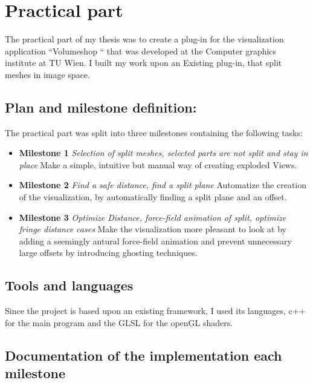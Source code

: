\chapter{Practical part}
The practical part of my thesis was to create a plug-in for the visualization application ``Volumeshop `` that was developed at the Computer graphics institute at TU Wien. I built my work upon an Existing plug-in, that split meshes in image space.
\section{Plan and milestone definition:}
The practical part was split into three milestones containing the following tasks:
\begin{itemize}
\item \textbf{Milestone 1} \emph{Selection of split meshes, selected parts are not split and stay in place} Make a simple, intuitive but manual way of creating exploded Views.
\item \textbf{Milestone 2} \emph{Find a safe distance, find a split plane} Automatize the creation of the visualization, by automatically finding a split plane and an offset.
\item \textbf{Milestone 3} \emph{Optimize Distance, force-field animation of split, optimize fringe distance cases} Make the visualization more pleasant to look at by adding a seemingly antural force-field animation and prevent unnecessary large offsets by introducing ghosting techniques.
\end{itemize}
\section {Tools and languages}
Since the project is based upon an existing framework, I used its languages, c++ for the main program and the GLSL for the openGL shaders.
\section{Documentation of the implementation each milestone}
